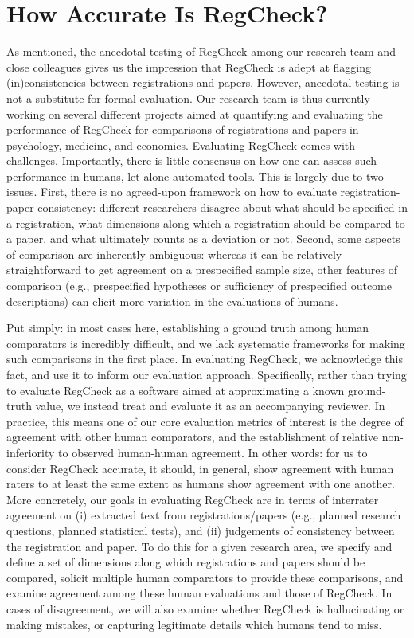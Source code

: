 \documentclass{article}
\begin{document}
\section{How Accurate Is RegCheck?}
As mentioned, the anecdotal testing of RegCheck among our research team and close colleagues gives us the impression that RegCheck is adept at flagging (in)consistencies between registrations and papers. However, anecdotal testing is not a substitute for formal evaluation. Our research team is thus currently working on several different projects aimed at quantifying and evaluating the performance of RegCheck for comparisons of registrations and papers in psychology, medicine, and economics. Evaluating RegCheck comes with challenges. Importantly, there is little consensus on how one can assess such performance in humans, let alone automated tools. This is largely due to two issues. First, there is no agreed-upon framework on how to evaluate registration-paper consistency: different researchers disagree about what should be specified in a registration, what dimensions along which a registration should be compared to a paper, and what ultimately counts as a deviation or not. Second, some aspects of comparison are inherently ambiguous: whereas it can be relatively straightforward to get agreement on a prespecified sample size, other features of comparison (e.g., prespecified hypotheses or sufficiency of prespecified outcome descriptions) can elicit more variation in the evaluations of humans.

Put simply: in most cases here, establishing a ground truth among human comparators is incredibly difficult, and we lack systematic frameworks for making such comparisons in the first place. In evaluating RegCheck, we acknowledge this fact, and use it to inform our evaluation approach. Specifically, rather than trying to evaluate RegCheck as a software aimed at approximating a known ground-truth value, we instead treat and evaluate it as an accompanying reviewer. In practice, this means one of our core evaluation metrics of interest is the degree of agreement with other human comparators, and the establishment of relative non-inferiority to observed human-human agreement. In other words: for us to consider RegCheck accurate, it should, in general, show agreement with human raters to at least the same extent as humans show agreement with one another. More concretely, our goals in evaluating RegCheck are in terms of interrater agreement on (i) extracted text from registrations/papers (e.g., planned research questions, planned statistical tests), and (ii) judgements of consistency between the registration and paper. To do this for a given research area, we specify and define a set of dimensions along which registrations and papers should be compared, solicit multiple human comparators to provide these comparisons, and examine agreement among these human evaluations and those of RegCheck. In cases of disagreement, we will also examine whether RegCheck is hallucinating or making mistakes, or capturing legitimate details which humans tend to miss.
\end{document}
